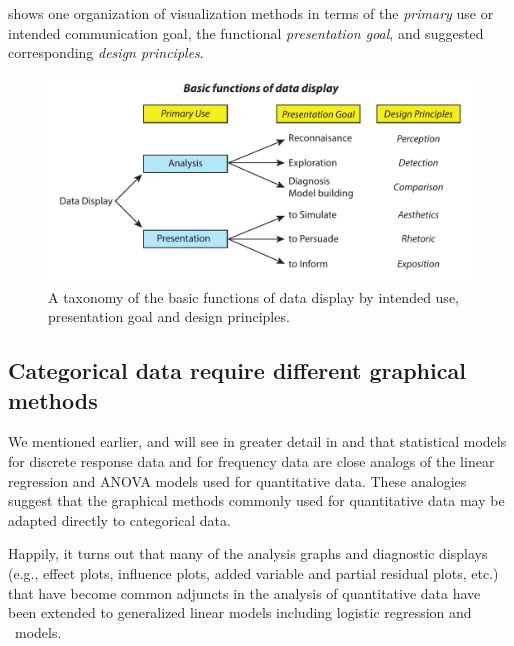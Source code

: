 \documentclass[11pt]{book}\usepackage[]{graphicx}\usepackage[]{color}
\begin{document}
shows one organization of visualization methods in terms
of the \emph{primary} use or intended communication goal,
the functional \emph{presentation goal}, and suggested corresponding
\emph{design principles}.
\begin{figure}[htbp]
  \centering 
  \includegraphics[width=\textwidth]{ch01/fig/datadisp}
  \caption[Basic functions of data display]{A taxonomy of the basic functions of data display by intended use, presentation goal and design principles.}\label{fig:datadisp}
\end{figure}


\subsection{Categorical data require different graphical methods}\label{sec:intro-catdata}

We mentioned earlier, and will see in greater detail 
in  and 
that statistical models for discrete
response data and for frequency 
data are close analogs of the linear regression and ANOVA models
used for quantitative data.
These analogies suggest that the graphical methods
commonly used for quantitative data may be adapted directly to
categorical data.

Happily, it turns out that many of the analysis graphs and diagnostic
displays (e.g., effect plots,
influence plots, added variable and partial residual
plots, etc.)
that have become common adjuncts in the analysis of
quantitative data have been extended to generalized linear models
including logistic regression and \loglin\ models.
\end{document}
